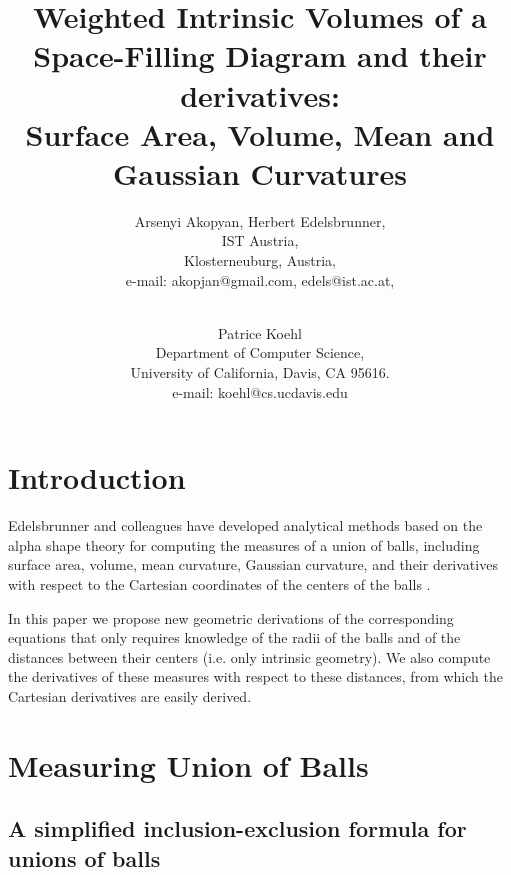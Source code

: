 \documentclass[11 pt]{article}
\title{Weighted Intrinsic Volumes of a Space-Filling Diagram and their derivatives: \\Surface Area, Volume, Mean and Gaussian Curvatures}
\author{Arsenyi Akopyan, Herbert Edelsbrunner,\\
            IST Austria, \\
            Klosterneuburg, Austria, \\
                 e-mail: akopjan@gmail.com, edels@ist.ac.at,\\ \\
        \and Patrice Koehl\\
            Department of Computer Science, \\
            University of California, Davis, CA 95616.\\
                 e-mail: koehl@cs.ucdavis.edu
        }
\theoremstyle{plain} \theorembodyfont{\rmfamily}
\begin{document}
\maketitle

\newpage




\section{Introduction}
\label{sec1}

Edelsbrunner and colleagues have developed analytical methods based on the alpha shape theory for
computing the measures of a union of balls, including surface area, volume, mean curvature, Gaussian curvature, and their 
derivatives with respect to the Cartesian coordinates of the centers of the balls \cite{Ede95, EdKo03, BEKL04, EdKo05, AkEd19a, AkEd19b}.

In this paper we propose new geometric derivations of the corresponding equations that only requires knowledge of the radii of the balls and of the distances between their centers (i.e. only intrinsic geometry). We also compute the derivatives of these measures with respect to these distances, from which the Cartesian derivatives are easily derived.

\section{Measuring Union of Balls}
\label{sec2}

\subsection{A simplified inclusion-exclusion formula for unions of balls}
\end{document}

